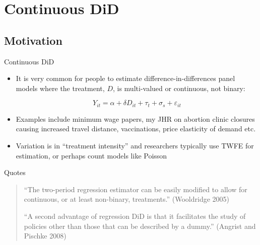 \documentclass{beamer}
\begin{document}




\section{Continuous DiD}

\subsection{Motivation}

\begin{frame}{Continuous DiD}

\begin{itemize}
\item It is very common for people to estimate difference-in-differences panel models where the treatment, $D$, is multi-valued or continuous, not binary:

$$Y_{it} = \alpha + \delta D_{it}  + \tau_t + \sigma_s + \varepsilon_{it}$$

\item Examples include minimum wage papers, my JHR on abortion clinic closures causing increased travel distance, vaccinations, price elasticity of demand etc.
\item Variation is in ``treatment intensity'' and researchers typically use TWFE for estimation, or perhaps count models like Poisson

\end{itemize}

\end{frame}


\begin{frame}{Quotes}

\begin{quote}
``The two-period regression estimator can be easily modified to allow for continuous, or at least non-binary, treatments.'' (Wooldridge 2005)

\bigskip

``A second advantage of regression DiD is that it facilitates the study of policies other than those that can be described by a dummy.'' (Angrist and Pischke 2008)

\end{quote}

\end{frame}

\clearpage
\end{document}
